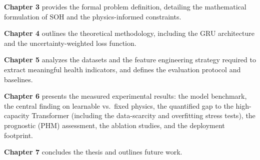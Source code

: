\textbf{Chapter 3} provides the formal problem definition, detailing the mathematical formulation of SOH and the physics-informed constraints. 

\textbf{Chapter 4} outlines the theoretical methodology, including the GRU architecture and the uncertainty-weighted loss function. 

\textbf{Chapter 5} analyzes the datasets and the feature engineering strategy required to extract meaningful health indicators, and defines the evaluation protocol and baselines.

\textbf{Chapter 6} presents the measured experimental results: the model benchmark, the central finding on learnable vs.\ fixed physics, the quantified gap to the high-capacity Transformer (including the data-scarcity and overfitting stress tests), the prognostic (PHM) assessment, the ablation studies, and the deployment footprint.

\textbf{Chapter 7} concludes the thesis and outlines future work.